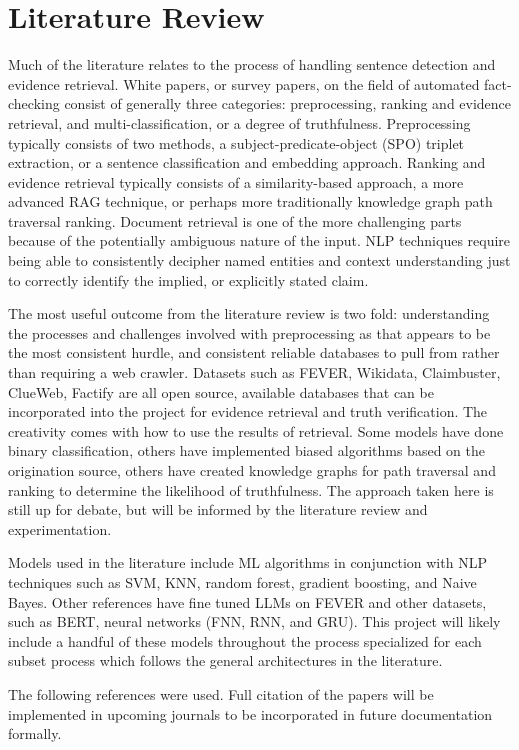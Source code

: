 \documentclass[11pt,letterpaper]{article}
\newcommand{\litReview}[1]{
    \section*{Literature Review}
    \addcontentsline{toc}{section}{Literature Review}
    #1
}
\begin{document}
\litReview{ 


Much of the literature relates to the process of handling sentence detection and evidence retrieval. White papers, or survey papers, on the field of automated fact-checking consist of generally three categories: preprocessing, ranking and evidence retrieval, and multi-classification, or a degree of truthfulness. Preprocessing typically consists of two methods, a subject-predicate-object (SPO) triplet extraction, or a sentence classification and embedding approach. Ranking and evidence retrieval typically consists of a similarity-based approach, a more advanced RAG technique, or perhaps more traditionally knowledge graph path traversal ranking. Document retrieval is one of the more challenging parts because of the potentially ambiguous nature of the input. NLP techniques require being able to consistently decipher named entities and context understanding just to correctly identify the implied, or explicitly stated claim. 

The most useful outcome from the literature review is two fold: understanding the processes and challenges involved with preprocessing as that appears to be the most consistent hurdle, and consistent reliable databases to pull from rather than requiring a web crawler. Datasets such as FEVER, Wikidata, Claimbuster, ClueWeb, Factify are all open source, available databases that can be incorporated into the project for evidence retrieval and truth verification. The creativity comes with how to use the results of retrieval. Some models have done binary classification, others have implemented biased algorithms based on the origination source, others have created knowledge graphs for path traversal and ranking to determine the likelihood of truthfulness. The approach taken here is still up for debate, but will be informed by the literature review and experimentation.

Models used in the literature include ML algorithms in conjunction with NLP techniques such as SVM, KNN, random forest, gradient boosting, and Naive Bayes. Other references have fine tuned LLMs on FEVER and other datasets, such as BERT, neural networks (FNN, RNN, and GRU). This project will likely include a handful of these models throughout the process specialized for each subset process which follows the general architectures in the literature.

The following references were used. Full citation of the papers will be implemented in upcoming journals to be incorporated in future documentation formally. 

}
\end{document}
